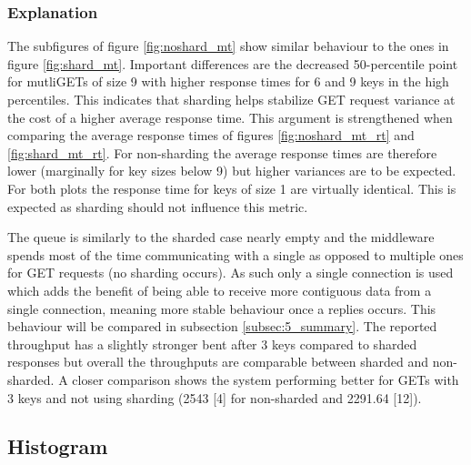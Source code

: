         \subsubsection{Explanation\label{subsubsec:5_nonsharded_summary}}

            The subfigures of figure \ref{fig:noshard_mt} show similar behaviour to the ones in figure
            \ref{fig:shard_mt}.  Important differences are the decreased 50-percentile point for mutliGETs of size 9
            with higher response times for 6 and 9 keys in the high percentiles. This indicates that sharding helps
            stabilize GET request variance at the cost of a higher average response time. This argument is strengthened
            when comparing the average response times of figures \ref{fig:noshard_mt_rt} and \ref{fig:shard_mt_rt}. For
            non-sharding the average response times are therefore lower (marginally for key sizes below 9) but higher
            variances are to be expected. For both plots the response time for keys of size 1 are virtually identical.
            This is expected as sharding should not influence this metric.


            The queue is similarly to the sharded case nearly empty and the middleware spends most of the time
            communicating with a single \srv{} as opposed to multiple ones for GET requests (no sharding occurs). As
            such only a single connection is used which adds the benefit of being able to receive more contiguous data
            from a single connection, meaning more stable behaviour once a replies occurs. This behaviour will be
            compared in subsection \ref{subsec:5_summary}.\newline
            The reported throughput has a slightly stronger bent after 3 keys compared to sharded responses but overall
            the throughputs are comparable between sharded and non-sharded. A closer comparison shows the system
            performing better for GETs with 3 keys and not using sharding (2543 [4] for non-sharded and 2291.64 [12]).

    \subsection{Histogram\label{subsec:5_histograms}}

